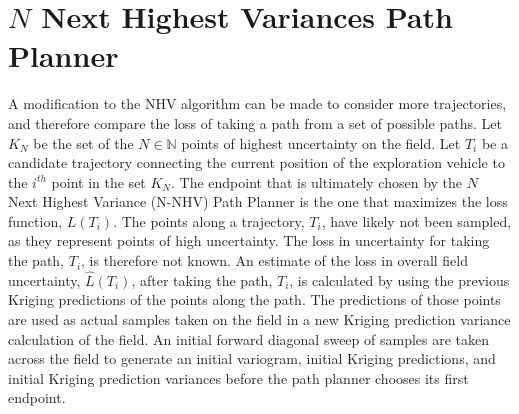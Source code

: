 \section{$N$ Next Highest Variances Path Planner} \label{sec:nnhv}
A modification to the NHV algorithm can be made to consider more trajectories, and therefore compare the loss of taking a path from a set of possible paths. Let $K_N$ be the set of the $N \in \mathbb{N}$ points of highest uncertainty on the field. Let $T_i$ be a candidate trajectory connecting the current position of the exploration vehicle to the $i^{th}$ point in the set $K_N$. The endpoint that is ultimately chosen by the $N$ Next Highest Variance (N-NHV) Path Planner is the one that maximizes the loss function, $L(T_i)$. The points along a trajectory, $T_i$, have likely not been sampled, as they represent points of high uncertainty. The loss in uncertainty for taking the path, $T_i$, is therefore not known. An estimate of the loss in overall field uncertainty, $\hat{L}(T_i)$, after taking the path, $T_i$, is calculated by using the previous Kriging predictions of the points along the path. The predictions of those points are used as actual samples taken on the field in a new Kriging prediction variance calculation of the field. An initial forward diagonal sweep of samples are taken across the field to generate an initial variogram, initial Kriging predictions, and initial Kriging prediction variances before the path planner chooses its first endpoint.


